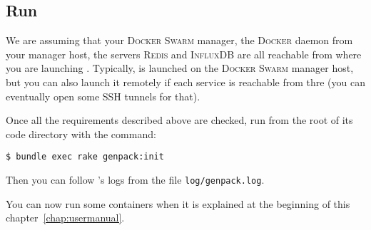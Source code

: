 
\subsection{Run \GP{}}
\label{subsec:genpacksetup:run}

We are assuming that your \textsc{Docker Swarm} manager, the \textsc{Docker} daemon from your manager host, the servers \textsc{Redis} and \textsc{InfluxDB} are all reachable from where you are launching \GP{}.
Typically, \GP{} is launched on the \textsc{Docker Swarm} manager host, but you can also launch it remotely if each service is reachable from thre (you can eventually open some SSH tunnels for that).

Once all the requirements described above are checked, run \GP{} from the root of its code directory with the command:

\begin{lstlisting}[basicstyle=\small]
$ bundle exec rake genpack:init
\end{lstlisting}

Then you can follow \GP{}'s logs from the file \texttt{log/genpack.log}.

You can now run some containers when it is explained at the beginning of this chapter~\ref{chap:usermanual}.
